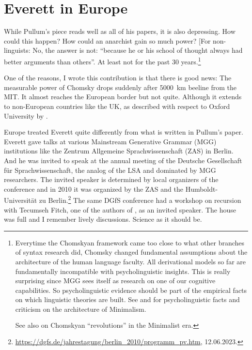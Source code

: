 \documentclass[output=paper,colorlinks,citecolor=brown]{langscibook}
\begin{document}
\section{Everett in Europe}

While Pullum's piece reads well as all of his papers, it is also depressing. How could this happen?
How could an anarchist gain so much power? [For non-linguists: No, the answer is not: ``because he or
his school of thought always had better arguments than others''. At least not for the past 30
years.\footnote{
Everytime the Chomskyan framework came too close to what other branches of syntax research did,
Chomsky changed fundamental assumptions about the architecture of the human language faculty. All
derivational models so far are fundamentally incompatible with psycholinguistic insights. This is really
surprising since MGG sees itself as research on one of our cognitive capabilities. So
psycholinguistic evidence should be part of the empirical facts on which linguistic theories are
built. See  and \citet{BM2021a} for psycholinguistic facts and criticism on the
architecture of Minimalism.

See also  on Chomskyan ``revolutions'' in the Minimalist era.
}

One of the reasons, I wrote this contribution is that
there is good news: The measurable power of Chomsky drops suddenly after 5000~km beeline from the
MIT. It almost reaches the European border but not quite. Although it extends to non-European countries like
the UK, as described with respect to Oxford University by . 

Europe treated Everett quite differently from what is written in Pullum's paper. Everett gave talks at
various Mainstream Generative Grammar (MGG) institutions like the Zentrum Allgemeine
Sprachwissenschaft (ZAS) in Berlin. And he was invited to
speak at the annual meeting of the Deutsche Gesellschaft für Sprachwissenschaft, the analog of the
LSA and dominated by MGG researchers. The invited speaker is determined by local organizers of the
conference and in 2010 it was organized by the ZAS and the Humboldt-Universität zu Berlin.\footnote{
\url{https://dgfs.de/jahrestagung/berlin_2010/programm_pv.htm}, 12.06.2023.
}
The same DGfS conference had a workshop on recursion with Tecumseh Fitch, one of the authors of
, as an invited speaker. The house was full and I remember lively
discussions. Science as it should be.
\end{document}
